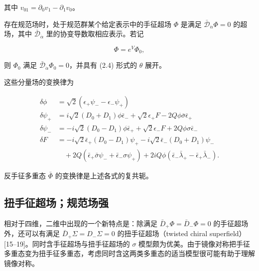 其中 $v_{01}=\partial_0v_1-\partial_1v_0$。

存在规范场时，处于规范群某个给定表示中的手征超场 $\Phi$ 是满足 $\bar{\mathcal D}_{\dot\alpha}\Phi=0$ 的超场，其中 $\bar{\mathcal D}_{\dot\alpha}$ 里的协变导数取相应表示。若记

\begin{equation}
\Phi=e^{V}\Phi_0,
\tag{2.13}
\end{equation}

则 $\Phi_0$ 满足 $\bar{\mathcal D}_{\dot\alpha}\Phi_0=0$，并具有 (2.4) 形式的 $\theta$ 展开。

\label{op:9}

这些分量场的变换律为

\begin{equation}
\begin{aligned}
\delta\phi &= \sqrt2(\epsilon_+\psi_--\epsilon_-\psi_+)\\
\delta\psi_+ &= i\sqrt2(D_0+D_1)\phi\bar\epsilon_-+\sqrt2\epsilon_+F-2Q\phi\bar\sigma\bar\epsilon_+\\
\delta\psi_- &= -i\sqrt2(D_0-D_1)\phi\bar\epsilon_++\sqrt2\epsilon_-F+2Q\phi\sigma\bar\epsilon_-\\
\delta F &= -i\sqrt2\bar\epsilon_+(D_0-D_1)\psi_+-i\sqrt2\bar\epsilon_-(D_0+D_1)\psi_-\\
&\quad +2Q(\bar\epsilon_+\bar\sigma\psi_-+\bar\epsilon_-\sigma\psi_+)+2iQ\phi(\bar\epsilon_-\bar\lambda_+-\bar\epsilon_+\bar\lambda_-).
\end{aligned}
\tag{2.14}
\end{equation}


反手征多重态 $\bar\Phi$ 的变换律是上述各式的复共轭。

\subsection*{扭手征超场；规范场强}

相对于四维，二维中出现的一个新特点是：除满足 $\bar D_+\Phi=\bar D_-\Phi=0$ 的手征超场外，还可以有满足 $\bar D_+\Sigma=D_-\Sigma=0$ 的扭手征超场（twisted chiral superfield）[15--19]。同时含手征超场与扭手征超场的 $\sigma$ 模型颇为优美。由于镜像对称把手征多重态变为扭手征多重态，考虑同时含这两类多重态的适当模型很可能有助于理解镜像对称。

